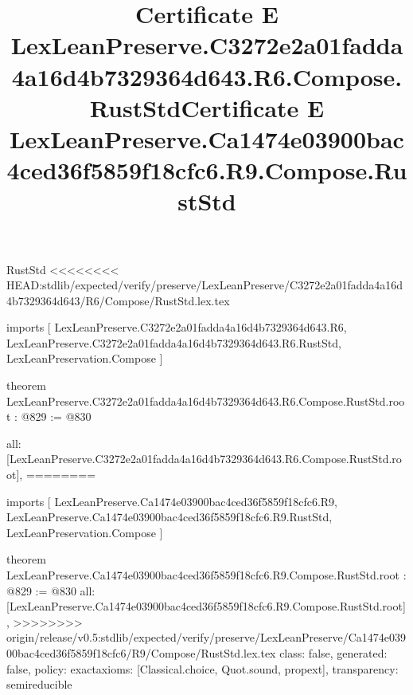 \begin{lexlean}{RustStd}
<<<<<<<< HEAD:stdlib/expected/verify/preserve/LexLeanPreserve/C3272e2a01fadda4a16d4b7329364d643/R6/Compose/RustStd.lex.tex
\title{Certificate E LexLeanPreserve.C3272e2a01fadda4a16d4b7329364d643.R6.Compose.RustStd}
\begin{coremodule}
imports [
  LexLeanPreserve.C3272e2a01fadda4a16d4b7329364d643.R6,
  LexLeanPreserve.C3272e2a01fadda4a16d4b7329364d643.R6.RustStd,
  LexLeanPreservation.Compose
]

theorem LexLeanPreserve.C3272e2a01fadda4a16d4b7329364d643.R6.Compose.RustStd.root : @829 := @830 {
  all: [LexLeanPreserve.C3272e2a01fadda4a16d4b7329364d643.R6.Compose.RustStd.root],
========
\title{Certificate E LexLeanPreserve.Ca1474e03900bac4ced36f5859f18cfc6.R9.Compose.RustStd}
\begin{coremodule}
imports [
  LexLeanPreserve.Ca1474e03900bac4ced36f5859f18cfc6.R9,
  LexLeanPreserve.Ca1474e03900bac4ced36f5859f18cfc6.R9.RustStd,
  LexLeanPreservation.Compose
]

theorem LexLeanPreserve.Ca1474e03900bac4ced36f5859f18cfc6.R9.Compose.RustStd.root : @829 := @830 {
  all: [LexLeanPreserve.Ca1474e03900bac4ced36f5859f18cfc6.R9.Compose.RustStd.root],
>>>>>>>> origin/release/v0.5:stdlib/expected/verify/preserve/LexLeanPreserve/Ca1474e03900bac4ced36f5859f18cfc6/R9/Compose/RustStd.lex.tex
  class: false,
  generated: false,
  policy: exact{axioms: [Classical.choice, Quot.sound, propext]},
  transparency: semireducible
}


\end{coremodule}}
\end{coremodule}
\end{lexlean}
